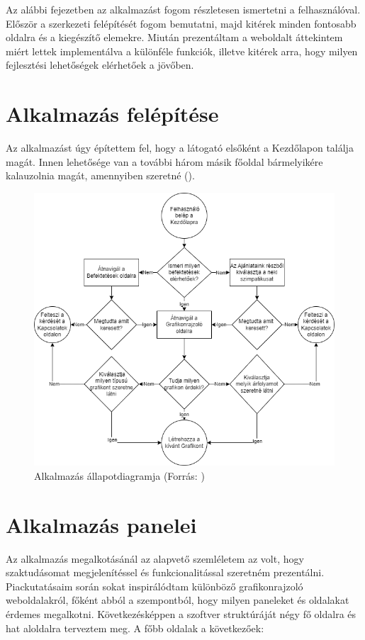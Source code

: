 
Az alábbi fejezetben az alkalmazást fogom részletesen ismertetni a felhasználóval. Először a szerkezeti felépítését fogom bemutatni, majd kitérek minden fontosabb oldalra és a kiegészítő elemekre. Miután prezentáltam a weboldalt áttekintem miért lettek implementálva a különféle funkciók, illetve kitérek arra, hogy milyen fejlesztési lehetőségek elérhetőek a jövőben.

\section{Alkalmazás felépítése}

Az alkalmazást úgy építettem fel, hogy a látogató elsőként a Kezdőlapon találja magát. Innen lehetősége van a további három másik főoldal bármelyikére kalauzolnia magát, amennyiben szeretné ().

\begin{figure}[h]
\centering
\includegraphics[scale=0.5]{images/flowchart.png}
\caption{Alkalmazás állapotdiagramja (Forrás: \cite{draw})}
\label{fig:draw}
\end{figure}

\section{Alkalmazás panelei}

Az alkalmazás megalkotásánál az alapvető szemléletem az volt, hogy szaktudásomat megjelenítéssel és funkcionalitással szeretném prezentálni. Piackutatásaim során sokat inspirálódtam különböző grafikonrajzoló weboldalakról, főként abból a szempontból, hogy milyen paneleket és oldalakat érdemes megalkotni. Következésképpen a szoftver struktúráját négy fő oldalra és hat aloldalra terveztem meg.\cite{Aegon} A főbb oldalak a következőek: 

